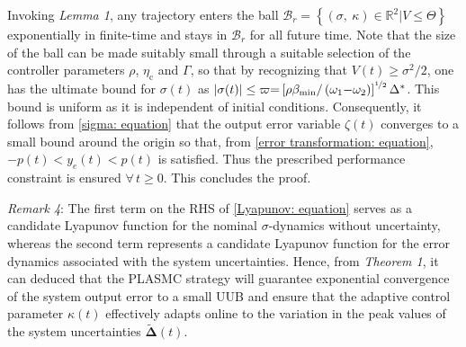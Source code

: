 \documentclass{IEEEtaes}
\begin{document}
Invoking \textit{Lemma 1}, any trajectory enters the ball $\mathcal{B}_r = \left \{ \left ( \sigma, ~ \kappa \right ) \in \mathbb{R}^2 | V \leq \Theta \right\}$ exponentially in finite-time and stays in $\mathcal{B}_r$ for all future time. Note that the size of the ball can be made suitably small through a suitable selection of the controller parameters $\rho$, $\eta_{\text{c}}$ and $\Gamma$, so that by recognizing that $V(t) \geq \sigma ^2/2$, one has the ultimate bound for $\sigma(t)$ as $\lvert \sigma(t) \rvert \leq \varpi {=} \left[\rho \beta_{\text{min}}/\left(\omega_1 {-} \omega_2\right)\right]^{\nicefrac{1}{2}}\Delta^{*}$. This bound is uniform as it is independent of initial conditions. 
Consequently, it follows from \eqref{sigma: equation} that the output error variable $\zeta(t)$ converges to a small bound around the origin so that, from \eqref{error transformation: equation}, ${-}p(t) < y_e(t) < p(t)$ is satisfied. Thus the prescribed performance constraint is ensured $\forall \, t \geq 0$. This concludes the proof.

\textit{Remark 4}: The first term on the RHS of \eqref{Lyapunov: equation} serves as a candidate Lyapunov function for the nominal $\sigma$-dynamics without uncertainty, whereas the second term represents a candidate Lyapunov function for the error dynamics associated with the system uncertainties.
Hence, from \textit{Theorem 1}, it can deduced that the PLASMC strategy will guarantee exponential convergence of the system output error to a small UUB and ensure that the adaptive control parameter $\kappa(t)$ effectively adapts online to the variation in the peak values of the system uncertainties $\tilde{\boldsymbol{\Delta}}(t)$.
\end{document}
